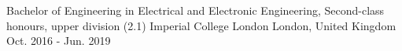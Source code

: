 
\begin{cventries}
  \cventry
    {Bachelor of Engineering in Electrical and Electronic Engineering, Second-class honours, upper division (2.1)} %
    {Imperial College London} %
    {London, United Kingdom} %
    {Oct. 2016 - Jun. 2019} %
    {
    }
\end{cventries}
